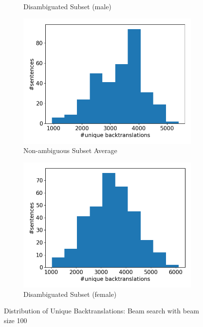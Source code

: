\begin{figure}[!htb]
\begin{subfigure}{0.49\textwidth}
         \caption{Disambiguated Subset (male)}
     \end{subfigure}
     \begin{subfigure}{0.49\textwidth}
         \centering
         \includegraphics[width=\textwidth]{figures/uniqueness/unique_beam100/unique_back_average.png}
         \caption{Non-ambiguous Subset Average}
     \end{subfigure}
     \hfill
     \begin{subfigure}{0.49\textwidth}
         \centering
         \includegraphics[width=\textwidth]{figures/uniqueness/unique_beam100/unique_back_female.png}
         \caption{Disambiguated Subset (female)}
     \end{subfigure}
        \caption{Distribution of Unique Backtranslations: Beam search with beam size 100}
        \label{fig:uniqueness_graphs_100}

\end{figure}

